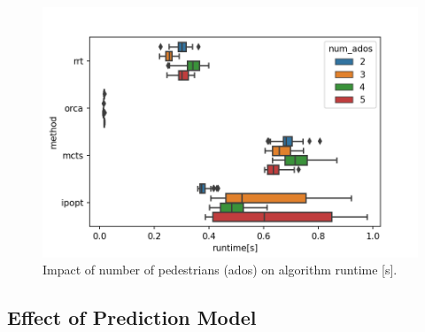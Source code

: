 \begin{figure}[!ht]
\begin{center}
\includegraphics[width=\imgwidth]{images/runtime_peds.png}
\end{center}
\caption{Impact of number of pedestrians (ados) on algorithm runtime [s].}
\label{img:runtime_num_pedestrian}
\end{figure}

\subsection{Effect of Prediction Model}

